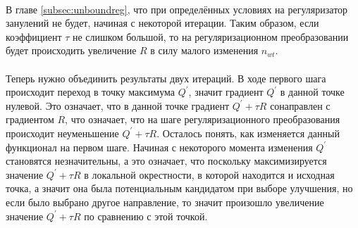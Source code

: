\documentclass[12pt]{article}
\begin{document}
\ \\
В главе \ref{subsec:unboundreg}, что при определённых условиях на регуляризатор занулений не будет, начиная с некоторой итерации. Таким образом, если коэффициент $\tau$ не слишком большой, то на регуляризационном преобразовании будет происходить увеличение $R$ в силу малого изменения $n_{wt}$.\\
\ \\
Теперь нужно объединить результаты двух итераций. В ходе первого шага происходит переход в точку максимума $Q^{\prime}$, значит градиент $Q^{\prime}$ в данной точке нулевой. Это означает, что в данной точке градиент $Q^{\prime} + \tau R$ сонаправлен с градиентом $R$, что означает, что на шаге регуляризационного преобразования происходит неуменьшение $Q^{\prime} + \tau R$. Осталось понять, как изменяется данный функционал на первом шаге. Начиная с некоторого момента изменения $Q^{\prime}$ становятся незначительны, а это означает, что поскольку максимизируется значение $Q^{\prime} + \tau R$ в локальной окрестности, в которой находится и исходная точка, а значит она была потенциальным кандидатом при выборе улучшения, но если было выбрано другое направление, то значит произошло увеличение значение $Q^{\prime} + \tau R$ по сравнению с этой точкой.\\
\end{document}
